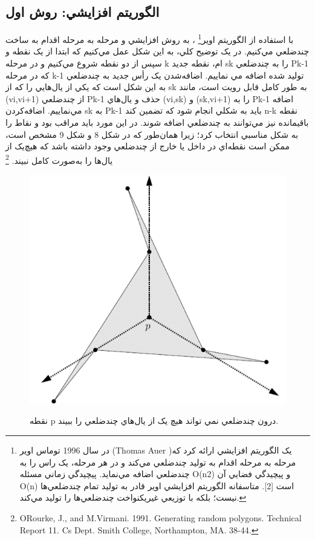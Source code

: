 \documentclass{book}
\begin{document}
\subsection{الگوريتم افزايشي: روش اول}

با استفاده از الگوريتم اوير\footnote{در سال 1996 توماس اوير (Thomas Auer )يک الگوريتم افزايشي ارائه کرد که مرحله به مرحله اقدام به توليد چندضلعي مي‌کند و در هر مرحله، يک راس را به چندضلعي اضافه مي‌نمايد. پيچيدگي زماني مسئله O(n2) و پيچيدگي فضايي آن O(n) است [2]. متاسفانه الگوريتم افزايشي اوير قادر به توليد تمام چندضلعي‌ها نيست؛ بلکه با توزيعي غيريکنواخت چندضلعي‌ها را توليد مي‌کند.}
، به روش افزايشي و مرحله به مرحله اقدام به ساخت چندضلعي مي‌کنيم.  در يک توضيح کلي، به اين شکل عمل مي‌کنيم که ابتدا از يک نقطه و سپس از دو نقطه شروع مي‌کنيم و در مرحله k ام، نقطه جديد sk را به چندضلعي Pk-1 که در مرحله k-1 توليد شده اضافه مي نماييم. اضافه‌شدن يک رأس جديد به چندضلعي به اين شکل است که يکي از يال‌هايي را که از sk به‌ طور کامل قابل رويت است، مانند (vi,vi+1) از چندضلعي Pk-1  حذف و يال‌هاي (vi,sk) و (sk,vi+1) را به Pk-1 اضافه مي‌نماييم. اضافه‌کردن sk به Pk-1 بايد به شکلي انجام شود که تضمين کند n-k نقطه باقيمانده نيز مي‌توانند به چندضلعي اضافه شوند. در اين مورد بايد مراقب بود و نقاط را به شکل مناسبي انتخاب کرد؛ زيرا همان‌طور که در شکل 8 و شکل 9 مشخص است، ممکن است نقطه‌اي در داخل يا خارج از چندضلعي وجود داشته باشد که هيچ‌يک از يال‌ها را به‌صورت کامل نبيند. \footnote{ORourke, J., and M.Virmani. 1991. Generating random polygons. Technical Report 11. Cs Dept. Smith College, Northampton, MA. 38-44.}

\begin{figure}[h!]
    \begin{center}
        \includegraphics[width=\linewidth]{see_exception.jpg}
        \label{see_exception}
        \caption{نقطه p  درون چندضلعي نمي تواند هيچ‌ يک از يال‌هاي چندضلعي را ببيند.}
    \end{center}
\end{figure}
\end{document}
